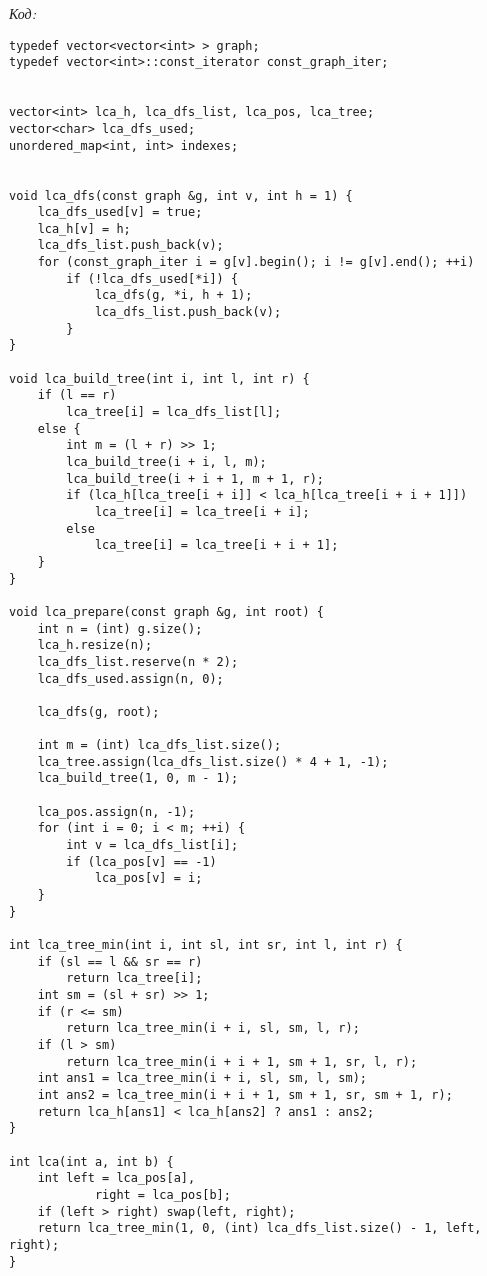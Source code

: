 \textit{Код:}
\tiny
\begin{center}
    \begin{verbatim}
typedef vector<vector<int> > graph;
typedef vector<int>::const_iterator const_graph_iter;


vector<int> lca_h, lca_dfs_list, lca_pos, lca_tree;
vector<char> lca_dfs_used;
unordered_map<int, int> indexes;


void lca_dfs(const graph &g, int v, int h = 1) {
    lca_dfs_used[v] = true;
    lca_h[v] = h;
    lca_dfs_list.push_back(v);
    for (const_graph_iter i = g[v].begin(); i != g[v].end(); ++i)
        if (!lca_dfs_used[*i]) {
            lca_dfs(g, *i, h + 1);
            lca_dfs_list.push_back(v);
        }
}

void lca_build_tree(int i, int l, int r) {
    if (l == r)
        lca_tree[i] = lca_dfs_list[l];
    else {
        int m = (l + r) >> 1;
        lca_build_tree(i + i, l, m);
        lca_build_tree(i + i + 1, m + 1, r);
        if (lca_h[lca_tree[i + i]] < lca_h[lca_tree[i + i + 1]])
            lca_tree[i] = lca_tree[i + i];
        else
            lca_tree[i] = lca_tree[i + i + 1];
    }
}

void lca_prepare(const graph &g, int root) {
    int n = (int) g.size();
    lca_h.resize(n);
    lca_dfs_list.reserve(n * 2);
    lca_dfs_used.assign(n, 0);

    lca_dfs(g, root);

    int m = (int) lca_dfs_list.size();
    lca_tree.assign(lca_dfs_list.size() * 4 + 1, -1);
    lca_build_tree(1, 0, m - 1);

    lca_pos.assign(n, -1);
    for (int i = 0; i < m; ++i) {
        int v = lca_dfs_list[i];
        if (lca_pos[v] == -1)
            lca_pos[v] = i;
    }
}

int lca_tree_min(int i, int sl, int sr, int l, int r) {
    if (sl == l && sr == r)
        return lca_tree[i];
    int sm = (sl + sr) >> 1;
    if (r <= sm)
        return lca_tree_min(i + i, sl, sm, l, r);
    if (l > sm)
        return lca_tree_min(i + i + 1, sm + 1, sr, l, r);
    int ans1 = lca_tree_min(i + i, sl, sm, l, sm);
    int ans2 = lca_tree_min(i + i + 1, sm + 1, sr, sm + 1, r);
    return lca_h[ans1] < lca_h[ans2] ? ans1 : ans2;
}

int lca(int a, int b) {
    int left = lca_pos[a],
            right = lca_pos[b];
    if (left > right) swap(left, right);
    return lca_tree_min(1, 0, (int) lca_dfs_list.size() - 1, left, right);
}


\end{verbatim}
\end{center}
